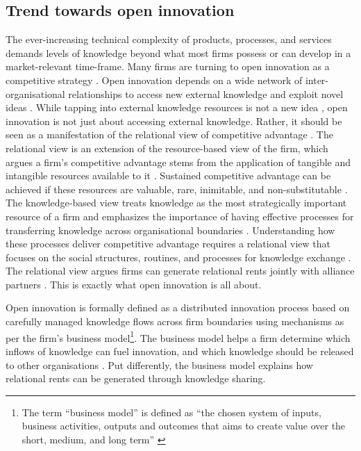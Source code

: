 \subsection{Trend towards open innovation}

The ever-increasing technical complexity of products, processes, and services demands levels of knowledge beyond what most firms possess or can develop in a market-relevant time-frame. Many firms are turning to open innovation as a competitive strategy \citep{enkel2009open,bessant2013innovation}. Open innovation depends on a wide network of inter-organisational relationships to access new external knowledge and exploit novel ideas \citep{chiaroni2010unravelling}. While tapping into external knowledge resources is not a new idea \citep{mowery2009plus,trott2009open}, open innovation is not just about accessing external knowledge. Rather, it should be seen as a manifestation of the relational view of competitive advantage \citep{dyer1998relational}. The relational view is an extension of the resource-based view of the firm, which argues a firm's competitive advantage stems from the application of tangible and intangible resources available to it \citep{wernerfelt1984resource,peteraf1993cornerstones}. Sustained competitive advantage can be achieved if these resources are valuable, rare, inimitable, and non-substitutable \citep{barney1991firm}. The knowledge-based view treats knowledge as the most strategically important resource of a firm and emphasizes the importance of having effective processes for transferring knowledge across organisational boundaries \citep{kogut1992knowledge,drucker1994post,grant1996toward}. Understanding how these processes deliver competitive advantage requires a relational view that focuses on the social structures, routines, and processes for knowledge exchange \citep{dyer1998relational}. The relational view argues firms can generate relational rents jointly with alliance partners \citep{dyer1998relational,lavie2006competitive}. This is exactly what open innovation is all about. \medskip

Open innovation is formally defined as a distributed innovation process based on carefully managed knowledge flows across firm boundaries using mechanisms as per the firm's business model\footnote{The term \enquote{business model} is defined as \enquote{the chosen system of inputs, business activities, outputs and outcomes that aims to create value over the short, medium, and long term} \citep{gould2013business}}. The business model helps a firm determine which inflows of knowledge can fuel innovation, and which knowledge should be released to other organisations \citep{chesbrough2017future}. Put differently, the business model explains how relational rents can be generated through knowledge sharing. \medskip

